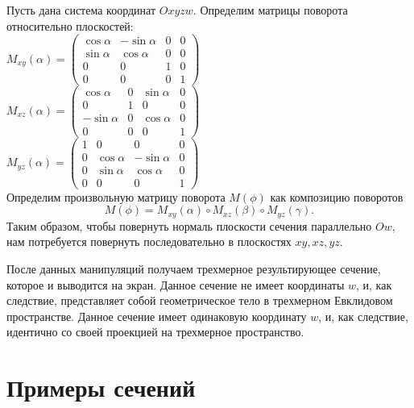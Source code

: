 \documentclass[12pt, a4paper, twoside]{report}
\begin{document}
Пусть дана система координат $Oxyzw$. Определим матрицы поворота относительно плоскостей:
\\

$
M_{xy}(\alpha)=
\begin{equation}
	\left(
		\begin{array}{cccc}
		\cos \alpha & -\sin \alpha & 0 & 0 \\
		\sin \alpha & \cos \alpha & 0 & 0 \\
		0 & 0 & 1 & 0 \\
		0 & 0 & 0 & 1
	\end{array}\right)
\end{equation}
$
\\ 

$
M_{xz}(\alpha)=
\begin{equation}
	\left(
		\begin{array}{cccc}
		\cos \alpha & 0 & \sin \alpha & 0 \\
		0 & 1 & 0 & 0 \\
		-\sin \alpha & 0 & \cos \alpha & 0 \\
		0 & 0 & 0 & 1
	\end{array}\right)
\end{equation}
$
\\

$
M_{yz}(\alpha)=
\begin{equation}
	\left(
		\begin{array}{cccc}
		1 & 0 & 0 & 0 \\
		0 & \cos \alpha & -\sin \alpha & 0 \\
		0 & \sin \alpha & \cos \alpha & 0 \\
		0 & 0 & 0 & 1
	\end{array}\right)
\end{equation}
$
\\

Определим произвольную матрицу поворота $M(\phi)$ как композицию поворотов $$M(\phi)=M_{xy}(\alpha)\circ M_{xz}(\beta)\circ M_{yz}(\gamma).$$
Таким образом, чтобы повернуть нормаль плоскости сечения параллельно $Ow$, нам потребуется повернуть последовательно в плоскостях $xy, xz, yz$.

После данных манипуляций получаем трехмерное результирующее сечение, которое и выводится на экран. Данное сечение не имеет координаты $w$, и, как следствие, представляет собой геометрическое тело в трехмерном Евклидовом пространстве.
Данное сечение имеет одинаковую координату $w$, и, как следствие, идентично со своей проекцией на трехмерное пространство.
\section{Примеры сечений}
\end{document}

